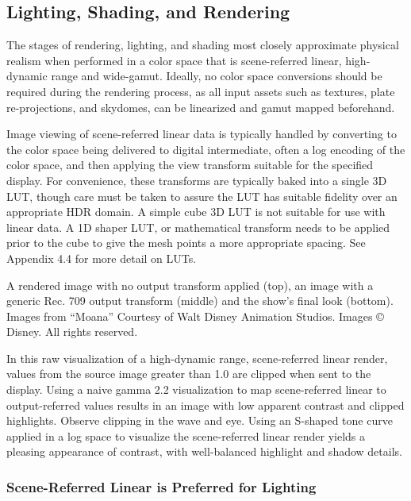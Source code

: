 \subsection{Lighting, Shading, and Rendering}
\label{subsec:lighting-shading-and-rendering}

The stages of rendering, lighting, and shading most closely approximate physical realism when performed in a color space that is scene-referred linear, high-dynamic range and wide-gamut. Ideally, no color space conversions should be required during the rendering process, as all input assets such as textures, plate re-projections, and skydomes, can be linearized and gamut mapped beforehand.

Image viewing of scene-referred linear data is typically handled by converting to the color space being delivered to digital intermediate, often a log encoding of the color space, and then applying the view transform suitable for the specified display. For convenience, these transforms are typically baked into a single 3D LUT, though care must be taken to assure the LUT has suitable fidelity over an appropriate HDR domain. A simple cube 3D LUT is not suitable for use with linear data. A 1D shaper LUT, or mathematical transform needs to be applied prior to the cube to give the mesh points a more appropriate spacing. See Appendix 4.4 for more detail on LUTs.



A rendered image with no output transform applied (top), an image with a generic Rec. 709 output transform (middle) and the show’s final look (bottom).
Images from “Moana” Courtesy of Walt Disney Animation Studios. Images © Disney. All rights reserved.

In this raw visualization of a high-dynamic range, scene-referred linear render, values from the source image greater than 1.0 are clipped when sent to the display. Using a naive gamma 2.2 visualization to map scene-referred linear to output-referred values results in an image with low apparent contrast and clipped highlights. Observe clipping in the wave and eye. Using an S-shaped tone curve applied in a log space to visualize the scene-referred linear render yields a pleasing appearance of contrast, with well-balanced highlight and shadow details.

\subsubsection{Scene-Referred Linear is Preferred for Lighting}
\label{subsubsec:scene-referred-linear-is-preferred-for-lighting}

